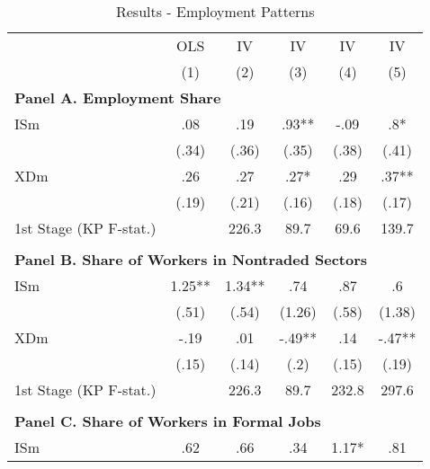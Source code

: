 \noindent \begin{center}
\begin{table}[h!]
\begin{center}
\protect\caption{\label{tab:Table_employment}Results - Employment Patterns}
\begin{centering}
\begin{tabular}{lccccc}
\hline 
 & {\footnotesize{}OLS } & {\footnotesize{}IV } & {\footnotesize{}IV } & {\footnotesize{}IV } & {\footnotesize{}IV }\tabularnewline
 & {\scriptsize{}(1)} & {\scriptsize{}(2)} & {\scriptsize{}(3)} & {\scriptsize{}(4)} & {\scriptsize{}(5)}\tabularnewline
\hline 
\multicolumn{6}{l}{\textbf{\footnotesize{}Panel A. Employment Share}}\tabularnewline
{\footnotesize{}ISm} & {\footnotesize{} .08} & {\footnotesize{} .19} & {\footnotesize{} .93**} & {\footnotesize{} -.09} & {\footnotesize{} .8*}\tabularnewline
 & {\scriptsize{}(.34)} & {\scriptsize{}(.36)} & {\scriptsize{}(.35)} & {\scriptsize{}(.38)} & {\scriptsize{}(.41)}\tabularnewline
{\footnotesize{}XDm} & {\footnotesize{} .26} & {\footnotesize{} .27} & {\footnotesize{} .27*} & {\footnotesize{} .29} & {\footnotesize{} .37**}\tabularnewline
 & {\scriptsize{}(.19)} & {\scriptsize{}(.21)} & {\scriptsize{}(.16)} & {\scriptsize{}(.18)} & {\scriptsize{}(.17)}\tabularnewline
{\scriptsize{}1st Stage (KP F-stat.)} &  & {\scriptsize{} 226.3} & {\scriptsize{} 89.7} & {\scriptsize{} 69.6} & {\scriptsize{} 139.7}\tabularnewline
 &  &  &  &  & \tabularnewline
\multicolumn{6}{l}{\textbf{\footnotesize{}Panel B. Share of Workers in Nontraded Sectors}}\tabularnewline
{\footnotesize{}ISm} & {\footnotesize{} 1.25**} & {\footnotesize{} 1.34**} & {\footnotesize{} .74} & {\footnotesize{} .87} & {\footnotesize{} .6}\tabularnewline
 & {\scriptsize{}(.51)} & {\scriptsize{}(.54)} & {\scriptsize{}(1.26)} & {\scriptsize{}(.58)} & {\scriptsize{}(1.38)}\tabularnewline
{\footnotesize{}XDm} & {\footnotesize{} -.19} & {\footnotesize{} .01} & {\footnotesize{} -.49**} & {\footnotesize{} .14} & {\footnotesize{} -.47**}\tabularnewline
 & {\scriptsize{}(.15)} & {\scriptsize{}(.14)} & {\scriptsize{}(.2)} & {\scriptsize{}(.15)} & {\scriptsize{}(.19)}\tabularnewline
{\scriptsize{}1st Stage (KP F-stat.)} &  & {\scriptsize{} 226.3} & {\scriptsize{} 89.7} & {\scriptsize{} 232.8} & {\scriptsize{} 297.6}\tabularnewline
 &  &  &  &  & \tabularnewline
\multicolumn{6}{l}{\textbf{\footnotesize{}Panel C. Share of Workers in Formal Jobs}}\tabularnewline
{\footnotesize{}ISm} & {\footnotesize{} .62} & {\footnotesize{} .66} & {\footnotesize{} .34} & {\footnotesize{} 1.17*} & {\footnotesize{} .81}\tabularnewline

\end{tabular}
\end{centering}
\end{center}
\end{table}
\end{center}
